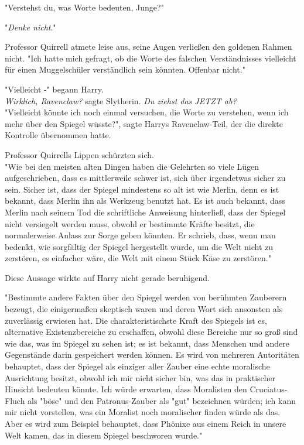 {"Verstehst du, was Worte bedeuten, Junge?"

"\emph{Denke nicht}."

Professor Quirrell atmete leise aus, seine Augen verließen den goldenen Rahmen nicht. "Ich hatte mich gefragt, ob die Worte des falschen Verständnisses vielleicht für einen Muggelschüler verständlich sein könnten. Offenbar nicht."

"Vielleicht -" begann Harry.\\ \emph{Wirklich, Ravenclaw?} sagte Slytherin. \emph{Du ziehst das JETZT ab?}\\ "Vielleicht könnte ich noch einmal versuchen, die Worte zu verstehen, wenn ich mehr über den Spiegel wüsste?", sagte Harrys Ravenclaw-Teil, der die direkte Kontrolle übernommen hatte.

Professor Quirrells Lippen schürzten sich.\\ "Wie bei den meisten alten Dingen haben die Gelehrten so viele Lügen aufgeschrieben, dass es mittlerweile schwer ist, sich über irgendetwas sicher zu sein. Sicher ist, dass der Spiegel mindestens so alt ist wie Merlin, denn es ist bekannt, dass Merlin ihn als Werkzeug benutzt hat. Es ist auch bekannt, dass Merlin nach seinem Tod die schriftliche Anweisung hinterließ, dass der Spiegel nicht versiegelt werden muss, obwohl er bestimmte Kräfte besitzt, die normalerweise Anlass zur Sorge geben könnten. Er schrieb, dass, wenn man bedenkt, wie sorgfältig der Spiegel hergestellt wurde, um die Welt nicht zu zerstören, es einfacher wäre, die Welt mit einem Stück Käse zu zerstören."

Diese Aussage wirkte auf Harry nicht gerade beruhigend.

"Bestimmte andere Fakten über den Spiegel werden von berühmten Zauberern bezeugt, die einigermaßen skeptisch waren und deren Wort sich ansonsten als zuverlässig erwiesen hat. Die charakteristischste Kraft des Spiegels ist es, alternative Existenzbereiche zu erschaffen, obwohl diese Bereiche nur so groß sind wie das, was im Spiegel zu sehen ist; es ist bekannt, dass Menschen und andere Gegenstände darin gespeichert werden können. Es wird von mehreren Autoritäten behauptet, dass der Spiegel als einziger aller Zauber eine echte moralische Ausrichtung besitzt, obwohl ich mir nicht sicher bin, was das in praktischer Hinsicht bedeuten könnte. Ich würde erwarten, dass Moralisten den Cruciatus-Fluch als "böse" und den Patronus-Zauber als "gut" bezeichnen würden; ich kann mir nicht vorstellen, was ein Moralist noch moralischer finden würde als das. Aber es wird zum Beispiel behauptet, dass Phönixe aus einem Reich in unsere Welt kamen, das in diesem Spiegel beschworen wurde."

}
